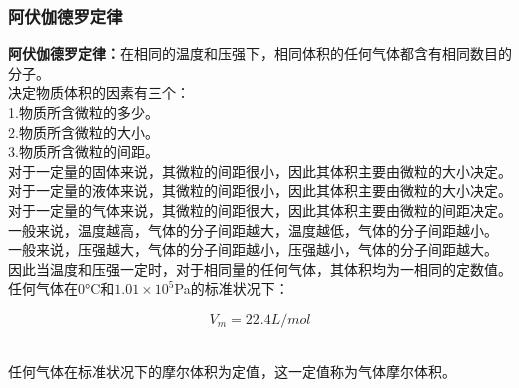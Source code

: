 \documentclass[UTF8]{ctexart}
\begin{document}
\subsubsection{阿伏伽德罗定律}
    \textbf{阿伏伽德罗定律：}在相同的温度和压强下，相同体积的任何气体都含有相同数目的分子。\\[5mm]
    决定物质体积的因素有三个：\\[3mm]
    1.物质所含微粒的多少。\\[3mm]
    2.物质所含微粒的大小。\\[3mm]
    3.物质所含微粒的间距。\\[6mm]
    对于一定量的固体来说，其微粒的间距很小，因此其体积主要由微粒的大小决定。\\[3mm]
    对于一定量的液体来说，其微粒的间距很小，因此其体积主要由微粒的大小决定。\\[3mm]
    对于一定量的气体来说，其微粒的间距很大，因此其体积主要由微粒的间距决定。\\[6mm]
    一般来说，温度越高，气体的分子间距越大，温度越低，气体的分子间距越小。\\[3mm]
    一般来说，压强越大，气体的分子间距越小，压强越小，气体的分子间距越大。\\[3mm]
    因此当温度和压强一定时，对于相同量的任何气体，其体积均为一相同的定数值。\\[6mm]
    任何气体在$0$\si{\degreeCelsius}和$1.01\times 10^5$\si{Pa}的标准状况下：
    \begin{large}
        \begin{equation*}
            V_m=22.4\si{L/mol}
        \end{equation*}
    \end{large}\\
    任何气体在标准状况下的摩尔体积为定值，这一定值称为气体摩尔体积。

\newpage
\end{document}
